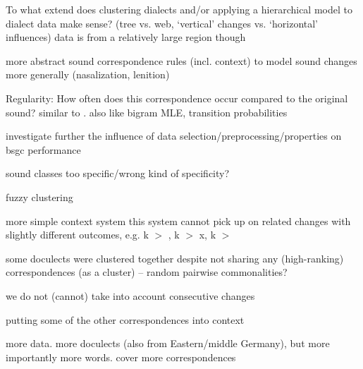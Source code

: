 \documentclass[a4paper]{article}
\begin{document}
To what extend does clustering dialects and/or applying a hierarchical model to dialect data make sense? (tree vs. web, `vertical' changes vs. `horizontal' influences)
data is from a relatively large region though

more abstract sound correspondence rules (incl. context) to model sound changes more generally (nasalization, lenition)

Regularity: How often does this correspondence occur compared to the original sound? similar to \citet{prokic2013combining}. also like bigram MLE, transition probabilities

investigate further the influence of data selection/preprocessing/properties on bsgc performance

sound classes too specific/wrong kind of specificity?

fuzzy clustering

more simple context system
this system cannot pick up on related changes with slightly different outcomes,
e.g. k $>$ , k $>$ x, k $>$ \textchi

some doculects were clustered together despite not sharing any (high-ranking) correspondences (as a cluster) -- random pairwise commonalities?

we do not (cannot) take into account consecutive changes

putting some of the other correspondences into context

more data. more doculects (also from Eastern/middle Germany), but more importantly more words. cover more correspondences



\end{document}
